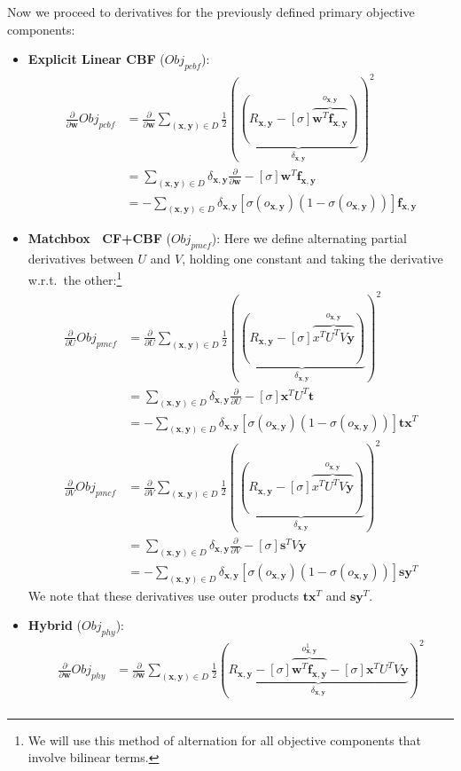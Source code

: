 \documentclass[11pt,a4paper]{article}
\newcommand{\Obj}{\mathit{Obj}}
\newcommand{\pcbf}{\mathit{pcbf}}
\newcommand{\pmcf}{\mathit{pmcf}}
\newcommand{\phy}{\mathit{phy}}
\newcommand{\x}{\vec{x}}
\newcommand{\y}{\vec{y}}
\newcommand{\w}{\vec{w}}
\newcommand{\f}{\vec{f}}
\newcommand{\s}{\vec{s}}
\renewcommand{\t}{\vec{t}}
\renewcommand{\vec}[1]{\mathbf{#1}}
\begin{document}
Now we proceed to derivatives for the previously defined primary
objective components:
\begin{itemize}
\item {\bf Explicit Linear CBF} ($\Obj_\pcbf$):
\begin{align*}
\frac{\partial}{\partial \w} \Obj_\pcbf & = \frac{\partial}{\partial \w} \sum_{(\x,\y) \in D} \frac{1}{2} \left( \underbrace{(R_{\x,\y} - [\sigma] \overbrace{\w^T \f_{\x,\y}}^{o_{\x,\y}})}_{\delta_{\x,\y}} \right)^2\\
& = \sum_{(\x,\y) \in D} \delta_{\x,\y} \frac{\partial}{\partial \w} - [\sigma] \w^T \f_{\x,\y}\\
& = - \sum_{(\x,\y) \in D} \delta_{\x,\y} [\sigma(o_{\x,\y}) (1 - \sigma(o_{\x,\y}))] \f_{\x,\y}
\end{align*}
\item {\bf Matchbox~\cite{matchbox} CF+CBF} ($\Obj_\pmcf$):
Here we define alternating partial derivatives between $U$ and $V$, holding one
constant and taking the derivative w.r.t.\ the other:\footnote{We will use
this method of alternation for all objective components that involve bilinear
terms.}
\begin{align*}
\frac{\partial}{\partial U} \Obj_\pmcf & = \frac{\partial}{\partial U} \sum_{(\x,\y) \in D} \frac{1}{2} \left( \underbrace{(R_{\x,\y} - [\sigma] \overbrace{x^T U^T V\y}^{o_{\x,\y}})}_{\delta_{\x,\y}} \right)^2\\
& = \sum_{(\x,\y) \in D} \delta_{\x,\y} \frac{\partial}{\partial U} - [\sigma] \x^T U^T \t \\
& = - \sum_{(\x,\y) \in D} \delta_{\x,\y} [\sigma(o_{\x,\y}) (1 - \sigma(o_{\x,\y}))] \t \x^T \\
\frac{\partial}{\partial V} \Obj_\pmcf & = \frac{\partial}{\partial V} \sum_{(\x,\y) \in D} \frac{1}{2} \left( \underbrace{(R_{\x,\y} - [\sigma] \overbrace{x^T U^T V\y}^{o_{\x,\y}})}_{\delta_{\x,\y}} \right)^2\\
& = \sum_{(\x,\y) \in D} \delta_{\x,\y} \frac{\partial}{\partial V} - [\sigma] \s^T V \y \\
& = - \sum_{(\x,\y) \in D} \delta_{\x,\y} [\sigma(o_{\x,\y}) (1 - \sigma(o_{\x,\y}))] \s \y^T
\end{align*}
We note that these derivatives use outer products $\t \x^T$ and $\s \y^T$.
\item {\bf Hybrid} ($\Obj_\phy$):
\begin{align*}
\frac{\partial}{\partial \w} \Obj_\phy & = \frac{\partial}{\partial \w} \sum_{(\x,\y) \in D} \frac{1}{2} \left( \underbrace{R_{\x,\y} - [\sigma] \overbrace{\w^T \f_{\x,\y}}^{o^1_{\x,\y}} - [\sigma] \x^T U^T V\y}_{\delta_{\x,\y}} \right)^2 \\

\end{align*}
\end{itemize}
\end{document}
